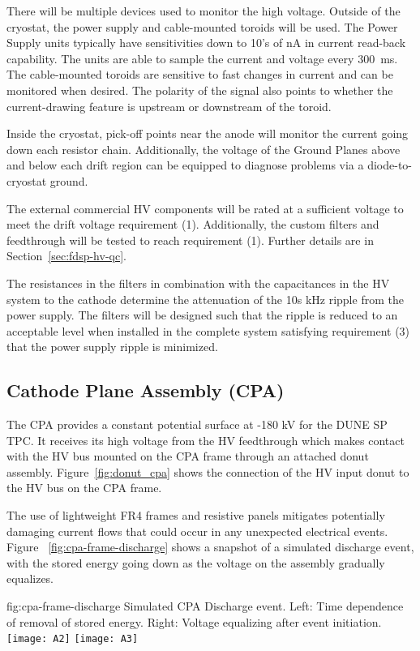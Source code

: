 There will be multiple devices used to monitor the high voltage.  Outside of the cryostat, the power supply and cable-mounted toroids will be used.  The Power Supply units typically have sensitivities down to 10's of nA in current read-back capability.  The units are able to sample the current and voltage every \SI{300}{ms}.  The cable-mounted toroids are sensitive to fast changes in current and can be monitored when desired.  The polarity of the signal also points to whether the current-drawing feature is upstream or downstream of the toroid.

Inside the cryostat, pick-off points near the anode will monitor the current going down each resistor chain.  Additionally, the voltage of the Ground Planes above and below each drift region can be equipped to diagnose problems via a diode-to-cryostat ground.

The external commercial HV components will be rated at a sufficient voltage to meet the drift voltage requirement (1).  Additionally, the custom filters and feedthrough will be tested to reach requirement (1).  Further details are in Section~\ref{sec:fdsp-hv-qc}.

The resistances in the filters in combination with the capacitances in the HV system to the cathode determine the attenuation of the 10s kHz ripple from the power supply.  The filters will be designed such that the ripple is reduced to an acceptable level when installed in the complete system satisfying requirement (3) that the power supply ripple is minimized.

\subsection{Cathode Plane Assembly (CPA)}

The CPA provides a constant potential surface at -180 kV for the DUNE SP TPC.  It receives its high voltage from the HV feedthrough which makes contact with the HV bus mounted on the CPA frame through an attached donut assembly. Figure~\ref{fig:donut_cpa} shows the connection of the HV input donut to the HV bus on the CPA frame. 

The use of lightweight FR4 frames and resistive panels mitigates potentially damaging current flows that could occur in any unexpected electrical events.  Figure ~\ref{fig:cpa-frame-discharge} shows a snapshot of a simulated discharge event, with the stored energy going down as the voltage on the assembly gradually equalizes.

\begin{dunefigure}
{fig:cpa-frame-discharge}
{Simulated CPA Discharge event. Left: Time dependence of removal of stored energy. Right: Voltage equalizing after event initiation.}
\texttt{[image: A2]}
\texttt{[image: A3]}
\end{dunefigure}

